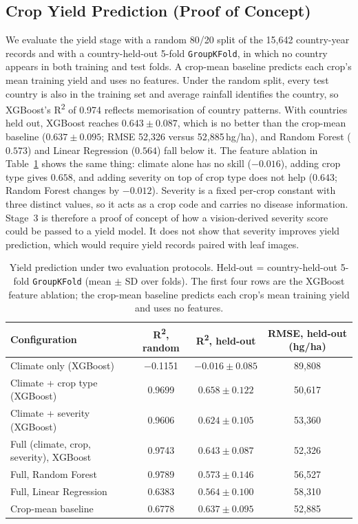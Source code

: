 \subsection{Crop Yield Prediction (Proof of Concept)}
\label{sec:yield}

We evaluate the yield stage with a random 80/20 split of the 15,642 country-year records and with a country-held-out 5-fold \texttt{GroupKFold}, in which no country appears in both training and test folds. A crop-mean baseline predicts each crop's mean training yield and uses no features. Under the random split, every test country is also in the training set and average rainfall identifies the country, so XGBoost's R\textsuperscript{2} of 0.974 reflects memorisation of country patterns. With countries held out, XGBoost reaches $0.643 \pm 0.087$, which is no better than the crop-mean baseline ($0.637 \pm 0.095$; RMSE 52,326 versus 52,885\,hg/ha), and Random Forest ($0.573$) and Linear Regression ($0.564$) fall below it. The feature ablation in Table~\ref{tab:yield} shows the same thing: climate alone has no skill ($-0.016$), adding crop type gives $0.658$, and adding severity on top of crop type does not help ($0.643$; Random Forest changes by $-0.012$). Severity is a fixed per-crop constant with three distinct values, so it acts as a crop code and carries no disease information. Stage~3 is therefore a proof of concept of how a vision-derived severity score could be passed to a yield model. It does not show that severity improves yield prediction, which would require yield records paired with leaf images.

\begin{table}[!htbp]
\centering
\caption{Yield prediction under two evaluation protocols. Held-out =
  country-held-out 5-fold \texttt{GroupKFold} (mean $\pm$ SD over folds).
  The first four rows are the XGBoost feature ablation; the crop-mean
  baseline predicts each crop's mean training yield and uses no features.}
\label{tab:yield}
\small
\begin{tabular}{lccc}
\toprule
\textbf{Configuration} & \textbf{R\textsuperscript{2}, random} &
\textbf{R\textsuperscript{2}, held-out} & \textbf{RMSE, held-out (hg/ha)}\\
\midrule
Climate only (XGBoost)                  & $-$0.1151 & $-0.016 \pm 0.085$ & 89,808\\
Climate + crop type (XGBoost)           & 0.9699    & $0.658 \pm 0.122$  & 50,617\\
Climate + severity (XGBoost)            & 0.9606    & $0.624 \pm 0.105$  & 53,360\\
Full (climate, crop, severity), XGBoost & 0.9743    & $0.643 \pm 0.087$  & 52,326\\
\midrule
Full, Random Forest                     & 0.9789    & $0.573 \pm 0.146$  & 56,527\\
Full, Linear Regression                 & 0.6383    & $0.564 \pm 0.100$  & 58,310\\
\midrule
Crop-mean baseline                      & 0.6778    & $0.637 \pm 0.095$  & 52,885\\
\bottomrule
\end{tabular}
\end{table}

